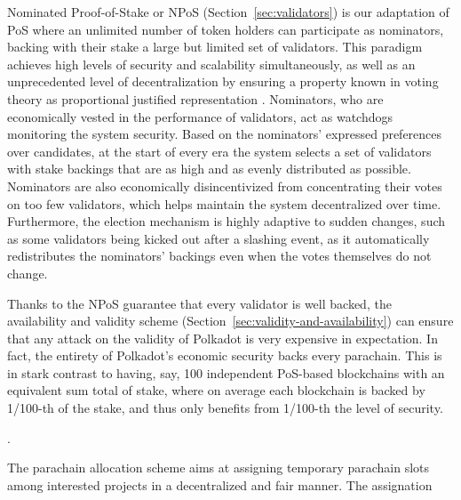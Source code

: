 Nominated Proof-of-Stake or NPoS (Section~\ref{sec:validators}) is our adaptation of PoS where an unlimited number of token holders can participate as nominators, backing with their stake a large but limited set of validators. This paradigm achieves high levels of security and scalability simultaneously, as well as an unprecedented level of decentralization by ensuring a property known in voting theory as proportional justified representation \cite{sanchez2017proportional, brill2017phragmen}. Nominators, who are economically vested in the performance of validators, act as watchdogs monitoring the system security. Based on the nominators' expressed preferences over candidates, at the start of every era the system selects a set of validators with stake backings that are as high and as evenly distributed as possible. Nominators are also economically disincentivized from concentrating their votes on too few validators, which helps maintain the system decentralized over time. Furthermore, the election mechanism is highly adaptive to sudden changes, such as some validators being kicked out after a slashing event, as it automatically redistributes the nominators' backings even when the votes themselves do not change. 

Thanks to the NPoS guarantee that every validator is well backed, the availability and validity scheme (Section~\ref{sec:validity-and-availability}) can ensure that any attack on the validity of Polkadot is very expensive in expectation. In fact, the entirety of Polkadot's economic security backs every parachain. 
This is in stark contrast to having, say, 100 independent PoS-based blockchains with an equivalent sum total of stake, where on average each blockchain is backed by 1/100-th of the stake, and thus only benefits from 1/100-th the level of security.  

 

 . 



  


The parachain allocation scheme aims at assigning temporary parachain slots among interested projects in a decentralized and fair manner. The assignation
